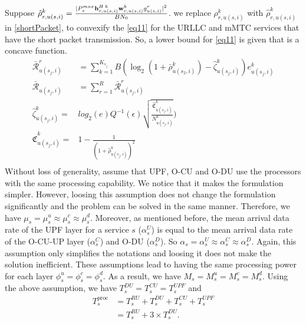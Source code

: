 \documentclass[conference]{IEEEtran}
\begin{document}
Suppose $\hat{\rho}_{r,u(s,i)}^{k} =  \frac{|P_{s}^{max}{\bold{h}_{r,u(s,i)}^{H \: k}} \bold{w}_{r,u(s,i)}^{k} g_{u(s,i)}^r|^2}{BN_0}$. 
we replace ${\rho}_{r,u(s,i)}^{k}$ with $\hat{\rho}_{r,u(s,i)}^{k}$ in \eqref{shortPacket}, to convexify the \eqref{eq11} for the URLLC and mMTC services that have the short packet transmission.
So, a lower bound for \eqref{eq11} is given that is a concave function.
\begin{equation}
\begin{split}
\bar{\mathcal{R}}_{u(s_j,i)}^{r} &= \sum_{k=1}^{K_{s_j}} B (\log_2({1+ \bar{\rho}_{u(s_2,i)}^{k}})- \hat{\zeta}_{u(s_j,i)}^{k}){e}_{u(s_j,i)}^{k}\\
\bar{\mathcal{R}}_{u(s_j,i)} &= \sum_{r=1}^{R}\bar{\mathcal{R}}_{u(s_j,i)}^{r}\\ 
 \hat{\zeta}_{u(s_j,i)}^{k} =& log_2({e})Q^{-1}(\epsilon) \sqrt{\frac{\hat{\mathfrak{C}}_{u(s_j,i)}^{k}}{N_{u(s_j,i)}^{k}}})\\
 \hat{\mathfrak{C}}_{u(s_j,i)}^{k} =& 1 - \frac{1}{(1+\hat{\rho}_{u(s_j,i)}^{k})^2}\\
\end{split}
\end{equation}
Without loss of generality, assume that UPF, O-CU and O-DU use the processors with the same processing capability. We notice that it makes the formulation simpler. However, loosing this assumption does not change the formulation significantly and the problem can be solved in the same manner. Therefore, we have $\mu_s = \mu_s^u \approx \mu_s^c \approx \mu_s^d $. Moreover, as mentioned before,
the mean arrival data rate of the UPF layer for a service $s$ ($\alpha_{s}^U$) is equal to the mean arrival data rate of the O-CU-UP layer ($\alpha_{s}^C$) and O-DU ($\alpha_{s}^D$). So $\alpha_{s} =\alpha_{s}^U \approx \alpha_{s}^C \approx \alpha_{s}^D$. Again, this assumption only simplifies the notations and loosing it does not make the solution inefficient.
These assumptions lead to having the same processing power for each layer $\phi_s^u = \phi_s^c =\phi_s^d $.
As a result, we have $M_s = M_s^u = M_s^c = M_s^d $.
Using the above assumption, we have $T^{DU}_{s} = T^{CU}_{s} = T^{UPF}_{s}$ and 
\begin{equation}
\begin{split}
T^{\text{proc}}_{s} &=  T^{RU}_{s} + T^{DU}_{s} + T^{CU}_{s} + T^{UPF}_{s} \\
                     &=  T^{RU}_{s} + 3\times T^{DU}_{s}.
\end{split}
\end{equation}
\end{document}
